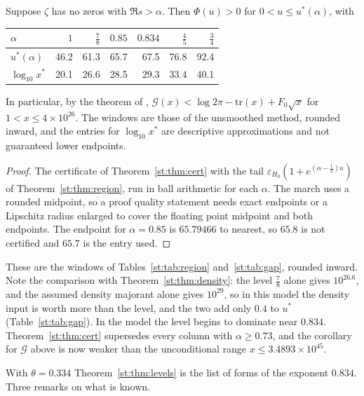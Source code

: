 \begin{theorem}\label{st:thm:certlevel}
Suppose $\zeta$ has no zeros with $\Re s>\alpha$. Then $\Phi(u)>0$ for $0<u\le u^*(\alpha)$, with
\begin{center}\footnotesize\setlength{\tabcolsep}{3.5pt}
\begin{tabular}{lrrrrrr}
\toprule
$\alpha$ & $1$ & $\frac78$ & $0.85$ & $0.834$ & $\frac45$ & $\frac34$\\
\midrule
$u^*(\alpha)$ & 46.2 & 61.3 & 65.7 & 67.5 & 76.8 & 92.4\\
$\log_{10}x^*$ & 20.1 & 26.6 & 28.5 & 29.3 & 33.4 & 40.1\\
\bottomrule
\end{tabular}
\end{center}
In particular, by the theorem of \cite{OAI26a}, $\mathcal G(x)<\log2\pi-\mathrm{tr}(x)+F_0\sqrt x$ for $1<x\le4\times10^{26}$. The windows are those of the unsmoothed method, rounded inward, and the entries for $\log_{10}x^*$ are descriptive approximations and not guaranteed lower endpoints.
\end{theorem}
\begin{proof}
The certificate of Theorem~\ref{st:thm:cert} with the tail $\varepsilon_{H_0}(1+e^{(\alpha-\frac12)u})$ of Theorem~\ref{st:thm:region}, run in ball arithmetic for each $\alpha$. The march uses a rounded midpoint, so a proof quality statement needs exact endpoints or a Lipschitz radius enlarged to cover the floating point midpoint and both endpoints. The endpoint for $\alpha=0.85$ is $65.79466$ to nearest, so $65.8$ is not certified and $65.7$ is the entry used.
\end{proof}
These are the windows of Tables~\ref{st:tab:region} and~\ref{st:tab:gap}, rounded inward. Note the comparison with Theorem~\ref{st:thm:density}: the level $\tfrac78$ alone gives $10^{26.6}$, and the assumed density majorant alone gives $10^{29}$, so in this model the density input is worth more than the level, and the two add only $0.4$ to $u^*$ (Table~\ref{st:tab:gap}). In the model the level begins to dominate near $0.834$. Theorem~\ref{st:thm:cert} supersedes every column with $\alpha\ge0.73$, and the corollary for $\mathcal G$ above is now weaker than the unconditional range $x\le3.4893\times10^{45}$.

With $\theta=0.334$ Theorem~\ref{st:thm:levels} is the list of forms of the exponent $0.834$. Three remarks on what is known.

